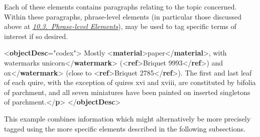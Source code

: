 \par
Each of these elements contains paragraphs relating to the topic concerned. Within these paragraphs, phrase-level elements (in particular those discussed above at \textit{\hyperref[msphrase]{10.3.\ Phrase-level Elements}}), may be used to tag specific terms of interest if so desired. \par\bgroup{}\exampleFont \begin{shaded}\noindent\mbox{}{<\textbf{objectDesc}\hspace*{1em}{form}="{codex}">}\mbox{}\newline 
{}\mbox{}\newline 
\hspace*{1em}Mostly {<\textbf{material}>}paper{</\textbf{material}>}, with watermarks\mbox{}\newline 
\hspace*{1em}unicorn{</\textbf{watermark}>} ({<\textbf{ref}>}Briquet 9993{</\textbf{ref}>}) and\mbox{}\newline 
\hspace*{1em}ox{</\textbf{watermark}>} (close to {<\textbf{ref}>}Briquet 2785{</\textbf{ref}>}). The first and last\mbox{}\newline 
\hspace*{1em}\hspace*{1em}\hspace*{1em}\hspace*{1em} leaf of each quire, with the exception of quires xvi and xviii, are constituted\mbox{}\newline 
\hspace*{1em}\hspace*{1em}\hspace*{1em}\hspace*{1em} by bifolia of parchment, and all seven miniatures have been painted on inserted\mbox{}\newline 
\hspace*{1em}\hspace*{1em}\hspace*{1em}\hspace*{1em} singletons of parchment.{</\textbf{p}>}\mbox{}\newline 
{}\mbox{}\newline 
{</\textbf{objectDesc}>}\end{shaded}\egroup\par \par
This example combines information which might alternatively be more precisely tagged using the more specific elements described in the following subsections.
